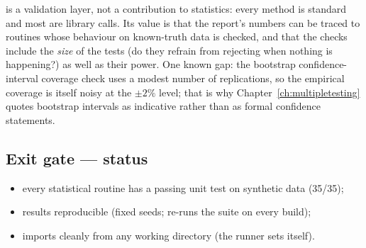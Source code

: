  is a validation layer, not a contribution to statistics: every method is
standard and most are library calls. Its value is that the report's numbers can be traced
to routines whose behaviour on known-truth data is checked, and that the checks include
the \emph{size} of the tests (do they refrain from rejecting when nothing is happening?)
as well as their power. One known gap: the bootstrap confidence-interval coverage check
uses a modest number of replications, so the empirical coverage is itself noisy at the
$\pm2\%$ level; that is why Chapter~\ref{ch:multipletesting} quotes bootstrap intervals
as indicative rather than as formal confidence statements.

\subsection{Exit gate --- status}

\begin{itemize}
  \item[\checkmark] every statistical routine has a passing unit test on synthetic data
    (35/35);
  \item[\checkmark] results reproducible (fixed seeds;  re-runs the suite
    on every build);
  \item[\checkmark]  imports cleanly from any working directory (the runner
    sets  itself).
\end{itemize}
